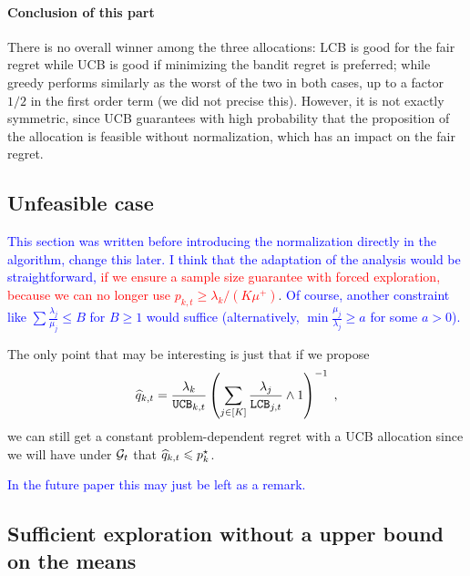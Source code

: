 \paragraph{Conclusion of this part} There is no overall winner among the three allocations: LCB is good for the fair regret while UCB is good if minimizing the bandit regret is preferred; while greedy performs similarly as the worst of the two in both cases, up to a factor $1/2$ in the first order term (we did not precise this). However, it is not exactly symmetric, since UCB guarantees with high probability that the proposition of the allocation is feasible without normalization, which has an impact on the fair regret.


\subsection{Unfeasible case}

\textcolor{blue}{This section was written before introducing the normalization directly in the algorithm, change this later. I think that the adaptation of the analysis would be straightforward,} \textcolor{red}{if we ensure a sample size guarantee with forced exploration, because we can no longer use $p_{k,t}\geq \lambda_k/(K\mu^+)$}. \textcolor{blue}{Of course, another constraint like $\sum \frac{\lambda_j}{\mu_j}\leq B$ for $B\geq 1$ would suffice (alternatively, $\min \frac{\mu_j}{\lambda_j}\geq a$ for some $a>0$).}

The only point that may be interesting is just that if we propose 
	\[ \widehat{q}_{k, t} = \frac{\lambda_k}{\texttt{UCB}_{k,t}} \left(\sum_{j \in [K]}\frac{\lambda_j}{\texttt{LCB}_{j,t}}\wedge1 \right)^{-1} \;, \]
	we can still get a constant problem-dependent regret with a UCB allocation since we will have under $\mathcal{G}_t$ that $\widehat{q}_{k, t} \leqslant p_k^\star$.
	
\textcolor{blue}{In the future paper this may just be left as a remark.}

\subsection{Sufficient exploration without a upper bound on the means}

